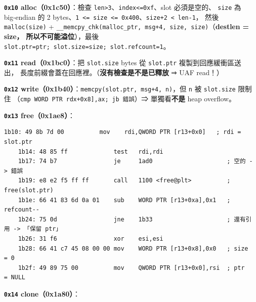 \documentclass[10pt,a4paper]{article}
\begin{document}
\textbf{\texttt{0x10} alloc（0x1c50）}：檢查
\texttt{len\textgreater{}\allowbreak{}3}、\texttt{index\textless{}\allowbreak{}=0xf}、slot
必須是空的、 \texttt{size} 為 big-endian 的 2
bytes、\texttt{1\ \allowbreak{}\textless{}\allowbreak{}=\ \allowbreak{}size\ \allowbreak{}\textless{}\allowbreak{}=\ \allowbreak{}0x400}、\texttt{size+2\ \allowbreak{}\textless{}\allowbreak{}\ \allowbreak{}len-\allowbreak{}1}，
然後 \texttt{malloc(size)} +
\texttt{\_\allowbreak{}\_\allowbreak{}memcpy\_\allowbreak{}chk(malloc\_\allowbreak{}ptr,\allowbreak{}\ \allowbreak{}msg+4,\allowbreak{}\ \allowbreak{}size,\allowbreak{}\ \allowbreak{}size)}（\textbf{destlen
= size， 所以不可能溢位}），最後
\texttt{slot.\allowbreak{}ptr=ptr;\ \allowbreak{}slot.\allowbreak{}size=size;\ \allowbreak{}slot.\allowbreak{}refcount=1}。

\textbf{\texttt{0x11} read（0x1bc0）}：把 \texttt{slot.\allowbreak{}size} bytes 從
\texttt{slot.\allowbreak{}ptr} 複製到回應緩衝區送出，
長度前綴會蓋在回應裡。（\textbf{沒有檢查是不是已釋放} ⇒ UAF read！）

\textbf{\texttt{0x12}
write（0x1b40）}：\texttt{memcpy(slot.\allowbreak{}ptr,\allowbreak{}\ \allowbreak{}msg+4,\allowbreak{}\ \allowbreak{}n)}，但 \texttt{n}
被 \texttt{slot.\allowbreak{}size} 限制住
（\texttt{cmp\ \allowbreak{}WORD\ \allowbreak{}PTR\ \allowbreak{}{[}rdx+0x8{]},\allowbreak{}ax;\ \allowbreak{}jb\ \allowbreak{}錯誤}）⇒
單獨看\textbf{不是} heap overflow。

\textbf{\texttt{0x13} free（0x1ae8）}：

\begin{Verbatim}[breaklines=true,breakanywhere=true,breakautoindent=false,fontsize=\fontsize{7.0}{9.5}\selectfont]
    1b10: 49 8b 7d 00          mov    rdi,QWORD PTR [r13+0x0]   ; rdi = slot.ptr
    1b14: 48 85 ff             test   rdi,rdi
    1b17: 74 b7                je     1ad0                     ; 空的 -> 錯誤
    1b19: e8 e2 f5 ff ff       call   1100 <free@plt>          ; free(slot.ptr)
    1b1e: 66 41 83 6d 0a 01    sub    WORD PTR [r13+0xa],0x1   ; refcount--
    1b24: 75 0d                jne    1b33                     ; 還有引用 -> 「保留 ptr」
    1b26: 31 f6                xor    esi,esi
    1b28: 66 41 c7 45 08 00 00 mov    WORD PTR [r13+0x8],0x0   ; size = 0
    1b2f: 49 89 75 00          mov    QWORD PTR [r13+0x0],rsi  ; ptr  = NULL
\end{Verbatim}

\textbf{\texttt{0x14} clone（0x1a80）}：
\end{document}
